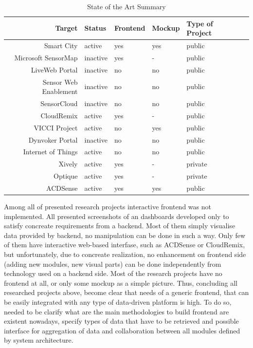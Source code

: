     \begin{table}[H]
	\centering
	\begin{tabular}{|r|l|l|l|l|l|}
	\hline
	Target 			       & Status & Frontend & Mockup & Type of Project \\
	\hline 
	Smart City		       & active & yes & yes & public \\
	\hline
	Microsoft SensorMap   & inactive & yes & - & public \\
	\hline
	LiveWeb Portal	       & inactive & no & no & public \\
	\hline
	Sensor Web Enablement  & inactive & no & no & public \\
	\hline
	SensorCloud		       & inactive & no & no & public \\
	\hline
	CloudRemix		       & active & yes & - & public \\
	\hline
	VICCI Project		   & active & no & yes & public \\
	\hline
	Dynvoker Portal		   & inactive & no & no & public \\
	\hline
	Internet of Things	   & active & no & no & public \\
	\hline
	Xively                 & active & yes & - & private \\
	\hline
	Optique                & active & yes & - & private \\
	\hline
	ACDSense               & active & yes & yes & public \\
	\hline
	\end{tabular}
	\caption[State of the Art]{State of the Art Summary}
	\label{tab:state_of_the_art}
	\end{table}

	 Among all of presented research projects interactive frontend was not implemented. All presented screenshots of an dashboards developed only to satisfy concreate requirements from a backend. Most of them simply visualise data provided by backend, no manipulation can be done in such a way. Only few of them have interactive web-based interfase, such as ACDSense or CloudRemix, but unfortunately, due to concreate realization, no enhancement on frontend side (adding new modules, new visual parts) can be done independently from technology used on a backend side. Most of the research projects have no frontend at all, or only some mockup as a simple picture. Thus, concluding all researched projects above, become clear that needs of a generic frontend, that can be easily integrated with any type of data-driven platform is high. To do so, needed to be clarify what are the main methodologies to build frontend are existent nowadays, specify types of data that have to be retrieved and possible interface for aggregation of data and collaboration between all modules defined by system architecture.

